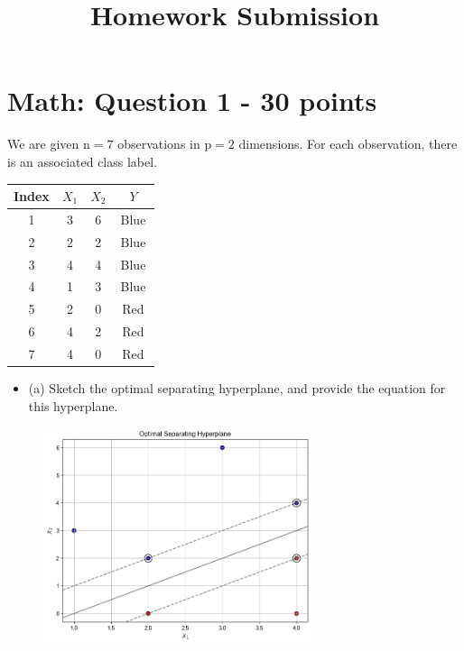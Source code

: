 \documentclass[11pt]{article}
\title{\textbf{Homework Submission}}
\author{}
\date{}
\begin{document}
	
	\maketitle
	
	
	\section*{Math: Question 1 - 30 points}
	
	We are given $\mathrm{n}=7$ observations in $\mathrm{p}=2$ dimensions. For each observation, there is an associated class label.
	
	\begin{center}
		\begin{tabular}{|c|c|c|c|}
			\hline
			Index & $X_{1}$ & $X_{2}$ & $Y$ \\
			\hline
			1 & 3 & 6 & Blue \\
			2 & 2 & 2 & Blue \\
			3 & 4 & 4 & Blue \\
			4 & 1 & 3 & Blue \\
			5 & 2 & 0 & Red \\
			6 & 4 & 2 & Red \\
			7 & 4 & 0 & $\operatorname{Red}$ \\
			\hline
		\end{tabular}
	\end{center}
	
	\begin{itemize}
		\item (a) Sketch the optimal separating hyperplane, and provide the equation for this hyperplane.
	\end{itemize}
	
	
	\begin{figure}[htbp]
		\centering
		\includegraphics[width=0.7\textwidth]{figures/figure.png}
	\end{figure}
	
\end{document}
